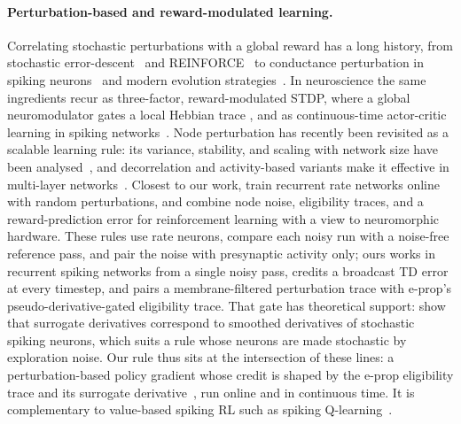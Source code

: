 \documentclass[10pt,twocolumn]{article}
\begin{document}
\paragraph{Perturbation-based and reward-modulated learning.}
Correlating stochastic perturbations with a global reward has a long history,
from stochastic error-descent~\citep{Cauwenberghs1992} and
REINFORCE~\citep{Williams1992REINFORCE} to conductance perturbation in spiking
neurons~\citep{fiete2006gradient} and modern evolution
strategies~\citep{salimans2017evolutionstrategiesscalablealternative}. In
neuroscience the same ingredients recur as three-factor, reward-modulated STDP,
where a global neuromodulator gates a local Hebbian trace
\citep{Fremaux2016NeuromodulatedSTDP,Izhikevich2007DistalReward,Florian2007RewardSTDP,Legenstein2008RewardSTDP},
and as continuous-time actor-critic learning in spiking
networks~\citep{Frmaux2013ReinforcementLU}. Node perturbation has recently
been revisited as a scalable learning rule: its variance, stability, and
scaling with network size have been analysed~\citep{Hiratani2022NodePerturbation},
and decorrelation and activity-based variants make it effective in multi-layer
networks~\citep{Dalm2026NodePerturbation}. Closest to our work,
\citet{GarciaFernandez2024RNNPerturbation} train recurrent rate networks online
with random perturbations, and \citet{GarciaFernandez2026NoiseReward} combine
node noise, eligibility traces, and a reward-prediction error for reinforcement
learning with a view to neuromorphic hardware. These rules use rate neurons,
compare each noisy run with a noise-free reference pass, and pair the noise
with presynaptic activity only; ours works in recurrent spiking networks from a
single noisy pass, credits a broadcast TD error at every timestep, and pairs a
membrane-filtered perturbation trace with e-prop's pseudo-derivative-gated
eligibility trace. That gate has theoretical support:
\citet{Gygax2025SurrogateTheory} show that surrogate derivatives correspond to
smoothed derivatives of stochastic spiking neurons, which suits a rule whose
neurons are made stochastic by exploration noise. Our rule thus sits at the
intersection of these lines: a perturbation-based policy gradient whose
credit is shaped by the e-prop eligibility trace and its surrogate
derivative~\citep{Neftci2019Surrogate}, run online and in continuous time. It
is complementary to value-based spiking RL such as spiking
Q-learning~\citep{Chen2022SpikingQLearning}.
\end{document}
